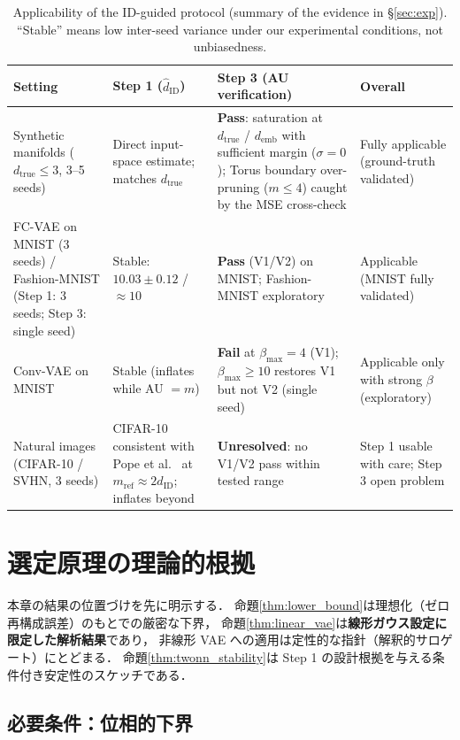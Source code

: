 \documentclass[11pt,a4paper]{jsarticle}
\newcommand{\hatdID}{\hat{d}_{\mathrm{ID}}}
\newcommand{\dtrue}{d_{\mathrm{true}}}
\newcommand{\demb}{d_{\mathrm{emb}}}
\begin{document}
\begin{table}[H]
\centering
\caption{Applicability of the ID-guided protocol (summary of the evidence in
§\ref{sec:exp}). ``Stable'' means low inter-seed variance under our
experimental conditions, not unbiasedness.}
\label{tab:applicability}
\small
\begin{tabular}{p{3.0cm}p{3.2cm}p{3.4cm}p{4.2cm}}
\toprule
Setting & Step 1 ($\hatdID$) & Step 3 (AU verification) & Overall \\
\midrule
Synthetic manifolds ($\dtrue \leq 3$, 3--5 seeds) & Direct input-space estimate; matches $\dtrue$ & \textbf{Pass}: saturation at $\dtrue$ / $\demb$ with sufficient margin ($\sigma = 0$); Torus boundary over-pruning ($m \leq 4$) caught by the MSE cross-check & Fully applicable (ground-truth validated) \\
\addlinespace
FC-VAE on MNIST (3 seeds) / Fashion-MNIST (Step 1: 3 seeds; Step 3: single seed) & Stable: $10.03 \pm 0.12$ / $\approx 10$ & \textbf{Pass} (V1/V2) on MNIST; Fashion-MNIST exploratory & Applicable (MNIST fully validated) \\
\addlinespace
Conv-VAE on MNIST & Stable (inflates while AU $= m$) & \textbf{Fail} at $\beta_{\max} = 4$ (V1); $\beta_{\max} \geq 10$ restores V1 but not V2 (single seed) & Applicable only with strong $\beta$ (exploratory) \\
\addlinespace
Natural images (CIFAR-10 / SVHN, 3 seeds) & CIFAR-10 consistent with Pope et al.~\cite{pope2021intrinsic} at $m_{\mathrm{ref}} \approx 2\hatdID$; inflates beyond & \textbf{Unresolved}: no V1/V2 pass within tested range & Step 1 usable with care; Step 3 open problem \\
\bottomrule
\end{tabular}
\end{table}

\section{選定原理の理論的根拠}\label{sec:theory}

本章の結果の位置づけを先に明示する．
命題\ref{thm:lower_bound}は理想化（ゼロ再構成誤差）のもとでの厳密な下界，
命題\ref{thm:linear_vae}は\textbf{線形ガウス設定に限定した解析結果}であり，
非線形 VAE への適用は定性的な指針（解釈的サロゲート）にとどまる．
命題\ref{thm:twonn_stability}は Step 1 の設計根拠を与える条件付き安定性のスケッチである．

\subsection{必要条件：位相的下界}\label{sec:theory_lower}
\end{document}
